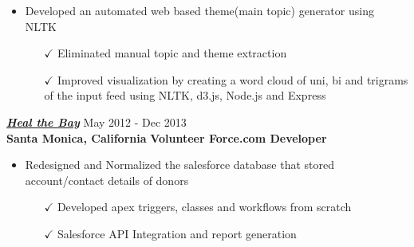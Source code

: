    \begin{itemize} \itemsep -2pt %
  \item Developed an automated web based theme(main topic) generator using NLTK\itemsep -2pt
   \begin{itemize}
    \item[$\checkmark$]  \itemsep -8pt%
   Eliminated manual topic and theme extraction\\
     \item[$\checkmark$]  \itemsep -8pt%
   Improved visualization by creating a word cloud of uni, bi and trigrams of the input feed using NLTK, d3.js, Node.js and Express\\
      \end{itemize}         
      \end{itemize}


   


   

\vspace{-2pt}
{\sl \href{www.healthebay.org/?}{\textbf{Heal the Bay}}} \hfill        May 2012 - Dec 2013 \\
  {\textbf{Santa Monica, California}}     \hfill   \textbf{Volunteer Force.com Developer}
   \begin{itemize} \itemsep -2pt %
   \item {Redesigned and Normalized the salesforce database that stored account/contact details of donors} \itemsep -2pt
   \begin{itemize}\item[$\checkmark$]  \itemsep -8pt%
   Developed apex triggers, classes and workflows from scratch
   \end{itemize}
     \begin{itemize}\item[$\checkmark$]  \itemsep -8pt%
   Salesforce API Integration and report generation
    \end{itemize}
       \end{itemize}
       
